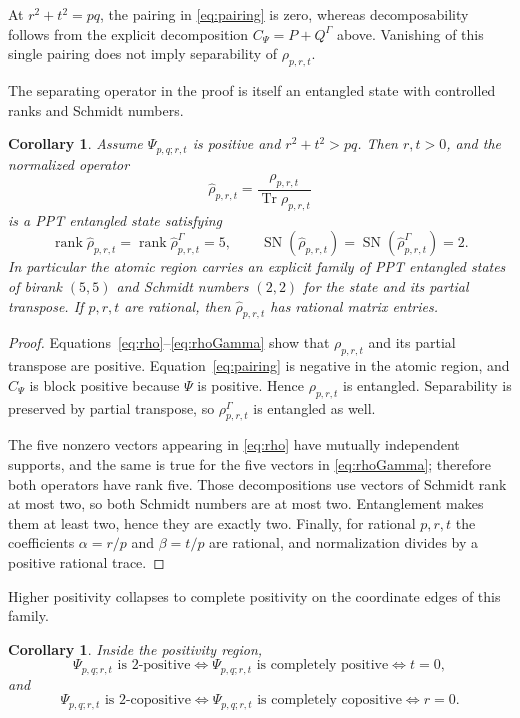 \documentclass[11pt]{amsart}
\newcommand{\chg}[1]{#1}
\newcommand{\rank}{\operatorname{rank}}
\newcommand{\Tr}{\operatorname{Tr}}
\newcommand{\SN}{\operatorname{SN}}
\theoremstyle{plain}
\newtheorem{corollary}[theorem]{Corollary}
\theoremstyle{definition}
\theoremstyle{remark}
\begin{document}
{
At $r^2+t^2=pq$, the pairing in \eqref{eq:pairing} is zero, whereas decomposability follows from the explicit decomposition $C_\Psi=P+Q^\Gamma$ above. Vanishing of this single pairing does not imply separability of $\rho_{p,r,t}$.
}

\chg{The separating operator in the proof is itself an entangled state with controlled ranks and Schmidt numbers.}

\begin{corollary}\label{cor:adapted-PPT}
Assume $\Psi_{p,q;r,t}$ is positive and $r^2+t^2>pq$. Then $r,t>0$, and the normalized operator
\[
\widehat\rho_{p,r,t}=\frac{\rho_{p,r,t}}{\Tr\rho_{p,r,t}}
\]
is a PPT entangled state satisfying
\[
\rank\widehat\rho_{p,r,t}=\rank\widehat\rho_{p,r,t}^\Gamma=5,
\qquad
\SN(\widehat\rho_{p,r,t})=\SN(\widehat\rho_{p,r,t}^\Gamma)=2.
\]
In particular the atomic region carries an explicit family of PPT entangled states of birank $(5,5)$ and \chg{Schmidt numbers $(2,2)$ for the state and its partial transpose}. If $p,r,t$ are rational, then $\widehat\rho_{p,r,t}$ has rational matrix entries.
\end{corollary}

\begin{proof}
Equations~\eqref{eq:rho}--\eqref{eq:rhoGamma} show that $\rho_{p,r,t}$ and its partial transpose are positive. Equation~\eqref{eq:pairing} is negative in the atomic region, and $C_\Psi$ is block positive because $\Psi$ is positive. Hence $\rho_{p,r,t}$ is entangled. Separability is preserved by partial transpose, so $\rho_{p,r,t}^\Gamma$ is entangled as well.

The five nonzero vectors appearing in \eqref{eq:rho} have mutually independent supports, and the same is true for the five vectors in \eqref{eq:rhoGamma}; therefore both operators have rank five. Those decompositions use vectors of Schmidt rank at most two, so both Schmidt numbers are at most two. Entanglement makes them at least two, hence they are exactly two. Finally, for rational $p,r,t$ the coefficients $\alpha=r/p$ and $\beta=t/p$ are rational, and normalization divides by a positive rational trace.
\end{proof}

\chg{Higher positivity collapses to complete positivity on the coordinate edges of this family.}

\begin{corollary}\label{cor:2positive}
Inside the positivity region,
\[
\Psi_{p,q;r,t}\text{ is $2$-positive}
\Longleftrightarrow
\Psi_{p,q;r,t}\text{ is completely positive}
\Longleftrightarrow t=0,
\]
and
\[
\Psi_{p,q;r,t}\text{ is $2$-copositive}
\Longleftrightarrow
\Psi_{p,q;r,t}\text{ is completely copositive}
\Longleftrightarrow r=0.
\]
\end{corollary}
\end{document}
